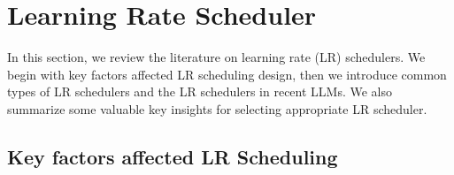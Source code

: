 \section{Learning Rate Scheduler}
\label{sec:lrsched}
In this section, we review the literature on learning rate (LR) schedulers. We begin with key factors affected LR scheduling design, then we introduce common types of LR schedulers and the LR schedulers in recent LLMs. We also summarize some valuable key insights for selecting appropriate LR scheduler.

\subsection{Key factors affected LR Scheduling}

